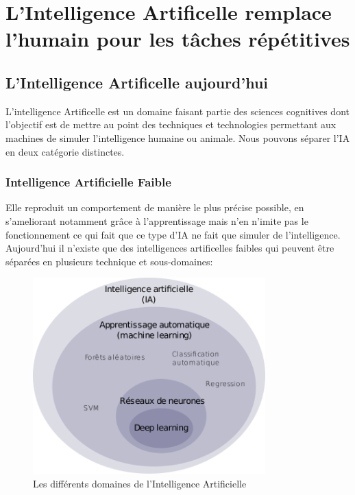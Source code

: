 \part{L'Intelligence Artificelle remplace l'humain pour les tâches répétitives}
\chapter{L'Intelligence Artificelle aujourd'hui}
L'intelligence Artificelle est un domaine faisant partie 
des sciences cognitives dont l'objectif est de mettre au
point des techniques et technologies permettant aux 
machines de simuler l'intelligence humaine ou animale.
Nous pouvons séparer l'IA en deux catégorie distinctes. 

\section{Intelligence Artificielle Faible}
Elle reproduit un comportement de manière le plus précise possible,
en s'ameliorant notamment grâce à l'apprentissage 
mais n'en n'imite pas le fonctionnement ce qui fait que
ce type d'IA ne fait que simuler de l'intelligence. \newline
Aujourd'hui il n'existe que des intelligences artificelles faibles qui peuvent  
être séparées en plusieurs technique et sous-domaines: \newline

\begin{figure}[!h]
    \centering
    \includegraphics[width=0.8\textwidth]{Images/aitype}
    \caption{Les différents domaines de l'Intelligence Artificielle}
	\label{fig:DiffDomaineIA}
\end{figure}
\newpage

